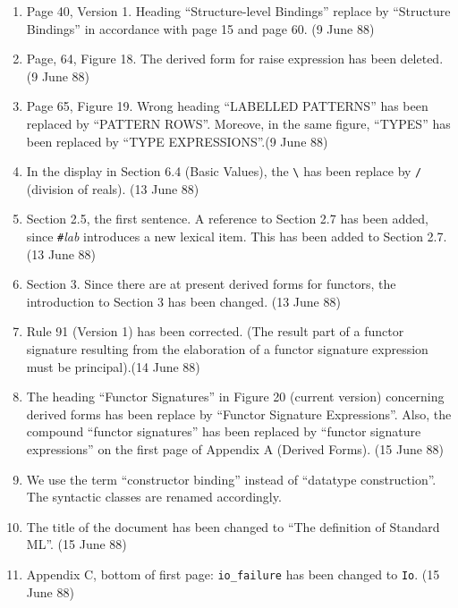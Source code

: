 \begin{description}
\begin{enumerate}
\item
Page 40, Version 1. Heading ``Structure-level Bindings'' replace by
``Structure Bindings'' in accordance with page 15 and page 60.
(9 June 88)

\item
Page, 64, Figure 18. The derived form for raise expression has been 
deleted. (9 June 88)

\item
Page 65, Figure 19. Wrong heading ``LABELLED PATTERNS'' has been replaced by
``PATTERN ROWS''. Moreove, in the same figure, ``TYPES'' has been
replaced by ``TYPE EXPRESSIONS''.(9 June 88)

\item
In the display in Section 6.4 (Basic Values), the \verb+\+ has
been replace by \verb+/+ (division of reals). (13 June 88)

\item
Section 2.5, the first sentence. A reference to Section 2.7 has been
added, since \verb+#+{\it lab} introduces a new lexical item. This has
been added to Section 2.7. (13 June 88)

\item
Section 3. Since there are at present derived forms for functors,
the introduction to Section 3 has been changed. (13 June 88)

\item
Rule 91 (Version 1) has been corrected. (The result part of
a functor signature resulting from the elaboration of a 
functor signature expression must be principal).(14 June 88)

\item
The heading ``Functor Signatures'' in Figure 20 (current version)
concerning derived forms has been replace by ``Functor Signature
Expressions''. Also, the compound ``functor signatures'' has
been replaced by ``functor signature expressions'' on the first
page of Appendix A (Derived Forms). (15 June 88)

\item
We use the term ``constructor binding'' instead of  ``datatype construction''.
The syntactic classes are renamed accordingly. 

\item
The title of the document has been changed to ``The definition
of Standard ML''. (15 June 88)

\item
Appendix C, bottom of first page: \verb+io_failure+ has been changed to
\verb+Io+. (15 June 88)


\end{enumerate}
\end{description}
